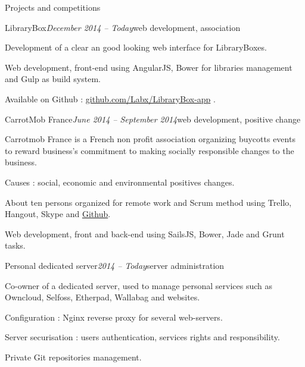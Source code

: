 \begin{rSection}{Projects and competitions}

  \begin{rSubsection}{LibraryBox}{\em December 2014 -- Today}{web development, association}{}
    \item[] Development of a clear an good looking web interface for LibraryBoxes.
    \item Web development, front-end using AngularJS, Bower for libraries management and Gulp as build system.
    \item Available on Github : \href{https://github.com/Labx/LibraryBox-app}{github.com/Labx/LibraryBox-app} .
  \end{rSubsection}

  \begin{rSubsection}{CarrotMob France}{\em June 2014 -- September 2014}{web development, positive change}{}
    \item[] Carrotmob France is a French non profit association organizing buycotts events to reward business's commitment to making socially responsible changes to the business.
    \item Causes : social, economic and environmental positives changes.
    \item About ten persons organized for remote work and Scrum method using Trello, Hangout, Skype and \href{https://github.com/carrotcommunity/carrotmobfrance}{Github}.
    \item Web development, front and back-end using SailsJS, Bower, Jade and Grunt tasks.
  \end{rSubsection}

  \begin{rSubsection}{Personal dedicated server}{\em 2014 -- Today}{server administration}{}
    \item[] Co-owner of a dedicated server, used to manage personal services such as Owncloud, Selfoss, Etherpad, Wallabag and websites.
    \item Configuration : Nginx reverse proxy for several web-servers.
    \item Server securisation : users authentication, services rights and responsibility.
    \item Private Git repositories management.
  \end{rSubsection}


\end{rSection}
